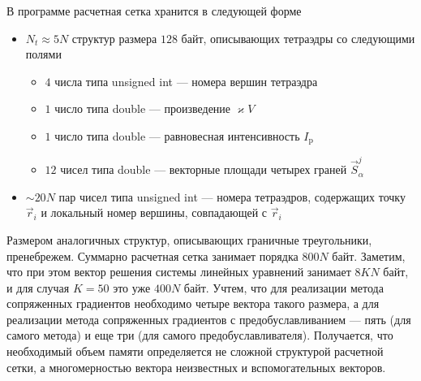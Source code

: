 В программе расчетная сетка хранится в следующей форме
\begin{itemize}
	\item $N_t \approx 5N$ структур размера $128$ байт, описывающих тетраэдры со следующими полями
	\begin{itemize}
	\item $4$ числа типа \textsf{unsigned int} --- номера вершин тетраэдра
	\item $1$ число типа \textsf{double} --- произведение $\varkappa V$
	\item $1$ число типа \textsf{double} --- равновесная интенсивность $I_\text{p}$
	\item $12$ чисел типа \textsf{double} --- векторные площади четырех граней $\vec S^j_\alpha$
	\end{itemize}
	\item $\sim 20N$ пар чисел типа \textsf{unsigned int} --- номера тетраэдров, содержащих точку $\vec r_i$ и локальный номер вершины, совпадающей с $\vec r_i$
\end{itemize}

Размером аналогичных структур, описывающих граничные треугольники, пренебрежем. Суммарно расчетная сетка занимает порядка $800N$ байт.
Заметим, что при этом вектор решения системы линейных уравнений занимает $8 K N$ байт, и для случая $K = 50$ это уже
$400N$ байт. Учтем, что для реализации метода сопряженных градиентов необходимо четыре вектора такого размера, а для реализации
метода сопряженных градиентов с предобуславливанием --- пять (для самого метода) и еще три (для самого предобуславливателя).
Получается, что необходимый объем памяти определяется не сложной структурой расчетной сетки, а многомерностью вектора неизвестных и вспомогательных векторов.

